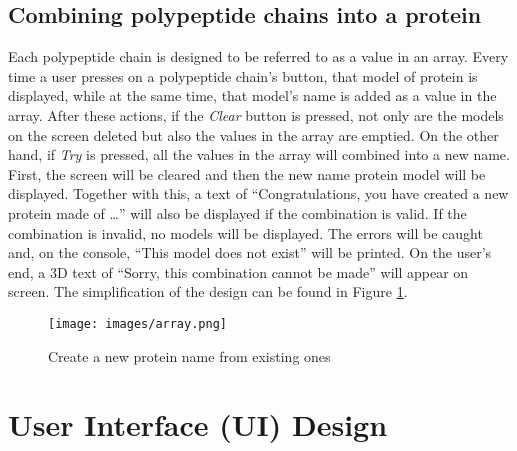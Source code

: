 \subsection{Combining polypeptide chains into a protein}
Each polypeptide chain is designed to be referred to as a value in an array. Every time a user presses on a polypeptide chain’s button, that model of protein is displayed, while at the same time, that model’s name is added as a value in the array. After these actions, if the \emph{Clear} button is pressed, not only are the models on the screen deleted but also the values in the array are emptied. On the other hand, if \emph{Try} is pressed, all the values in the array will combined into a new name. First, the screen will be cleared and then the new name protein model will be displayed. Together with this, a text of “Congratulations, you have created a new protein made of …” will also be displayed if the combination is valid. If the combination is invalid, no models will be displayed. The errors will be caught and, on the console, “This model does not exist” will be printed. On the user's end, a 3D text of “Sorry, this combination cannot be made” will appear on screen. The simplification of the design can be found in Figure \ref{fig:array}.
\begin{figure}[!htp]
	\centering
	\texttt{[image: images/array.png]}
	\caption{Create a new protein name from existing ones}
	\label{fig:array}
\end{figure}


\section{User Interface (UI) Design}
